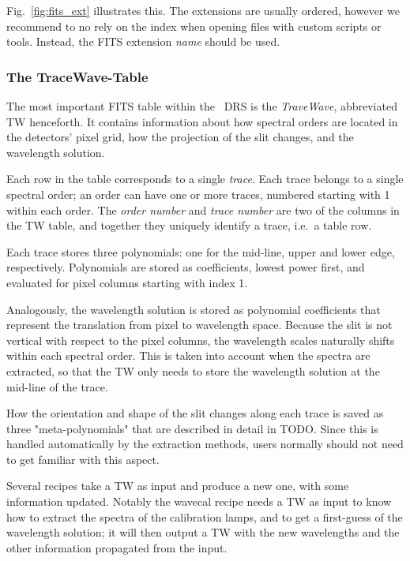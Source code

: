 Fig.~\ref{fig:fits_ext} illustrates this. The extensions are usually ordered,
however we recommend to no rely on the index when opening files with custom
scripts or tools. Instead, the FITS extension \emph{name} should be used.

\subsubsection{The TraceWave-Table}
\label{sec:tracewave}

The most important FITS table within the \instrument\ DRS is the
\emph{TraveWave}, abbreviated TW henceforth. It contains information about how
spectral orders are located in the detectors' pixel grid, how the projection of
the slit changes, and the wavelength solution.

Each row in the table corresponds to a single \emph{trace}. Each trace belongs
to a single spectral order; an order can have one or more traces, numbered
starting with 1 within each order. The \emph{order number} and \emph{trace
number} are two of the columns in the TW table, and together they uniquely
identify a trace, i.e.~a table row.

Each trace stores three polynomials: one for the mid-line, upper and lower edge,
respectively. Polynomials are stored as coefficients, lowest power first, and
evaluated for pixel columns starting with index 1.

Analogously, the wavelength solution is stored as polynomial coefficients that
represent the translation from pixel to wavelength space. Because the slit is
not vertical with respect to the pixel columns, the wavelength scales naturally
shifts within each spectral order. This is taken into account when the spectra
are extracted, so that the TW only needs to store the wavelength solution at the
mid-line of the trace.

How the orientation and shape of the slit changes along each trace is saved as
three "meta-polynomials" that are described in detail in TODO. Since this is handled automatically by the extraction methods, users normally should not need to get familiar with this aspect.

Several recipes take a TW as input and produce a new one, with some information
updated. Notably the wavecal recipe needs a TW as input to know how to extract
the spectra of the calibration lamps, and to get a first-guess of the
wavelength solution; it will then output a TW with the new wavelengths and
the other information propagated from the input.

